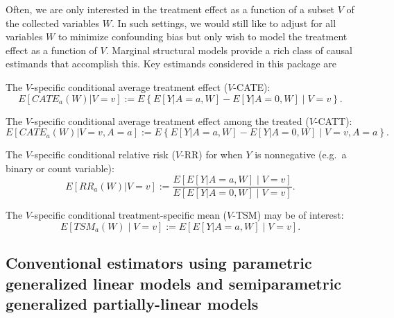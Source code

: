 \documentclass[
]{jss}
\begin{document}
Often, we are only interested in the treatment effect as a function of a
subset \(V\) of the collected variables \(W\). In such settings, we
would still like to adjust for all variables \(W\) to minimize
confounding bias but only wish to model the treatment effect as a
function of \(V\). Marginal structural models provide a rich class of
causal estimands that accomplish this. Key estimands considered in this
package are

\noindent The \(V\)-specific conditional average treatment effect
(\(V\)-CATE): \begin{equation}
E[CATE_{a}(W)|V=v] := E\left\{ E[Y|A=a,W] - E[Y|A=0, W] \mid V =v\right\}.
\end{equation}

\vspace{0.5cm}

\noindent The \(V\)-specific conditional average treatment effect among
the treated (\(V\)-CATT): \begin{equation}
E[CATE_{a}(W)|V=v, A=a] := E\left\{ E[Y|A=a,W] - E[Y|A=0, W] \mid V =v, A =a\right\}.
\end{equation} \vspace{0.5cm}

\noindent The \(V\)-specific conditional relative risk (\(V\)-RR) for
when \(Y\) is nonnegative (e.g.~a binary or count variable):
\begin{equation}
E[RR_a(W)|V=v] := \frac{E[E[Y|A=a,W] \mid V=v]}{E[E[Y|A=0,W] \mid V=v]}.
\end{equation}

\vspace{0.5cm}

\noindent The \(V\)-specific conditional treatment-specific mean
(\(V\)-TSM) may be of interest: \begin{equation}
E[TSM_a(W) \mid V =v ] := E[E[Y|A=a,W] \mid V = v].
\end{equation}

\subsection{Conventional estimators using parametric generalized linear models and semiparametric generalized partially-linear models}
\end{document}
